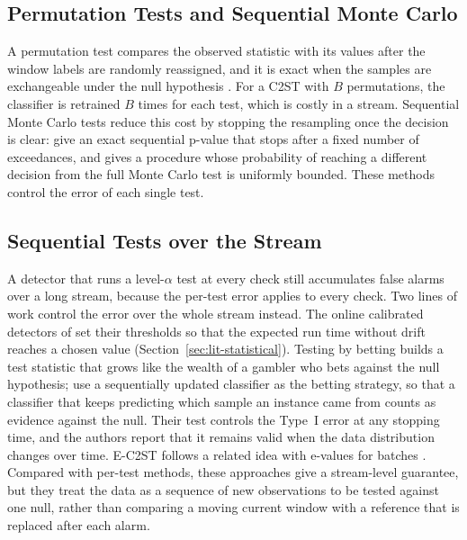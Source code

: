\subsection{Permutation Tests and Sequential Monte Carlo}
A permutation test compares the observed statistic with its values after the window labels are randomly reassigned, and it is exact when the samples are exchangeable under the null hypothesis \citep{Good2005}. For a C2ST with $B$ permutations, the classifier is retrained $B$ times for each test, which is costly in a stream. Sequential Monte Carlo tests reduce this cost by stopping the resampling once the decision is clear: \citet{BesagClifford1991} give an exact sequential p-value that stops after a fixed number of exceedances, and \citet{Gandy2009} gives a procedure whose probability of reaching a different decision from the full Monte Carlo test is uniformly bounded. These methods control the error of each single test.

\subsection{Sequential Tests over the Stream}
A detector that runs a level-$\alpha$ test at every check still accumulates false alarms over a long stream, because the per-test error applies to every check. Two lines of work control the error over the whole stream instead. The online calibrated detectors of \citet{CobbSequential2022} set their thresholds so that the expected run time without drift reaches a chosen value (Section~\ref{sec:lit-statistical}). Testing by betting builds a test statistic that grows like the wealth of a gambler who bets against the null hypothesis; \citet{PodkopaevRamdas2023} use a sequentially updated classifier as the betting strategy, so that a classifier that keeps predicting which sample an instance came from counts as evidence against the null. Their test controls the Type~I error at any stopping time, and the authors report that it remains valid when the data distribution changes over time. E-C2ST follows a related idea with e-values for batches \citep{EC2ST2024}. Compared with per-test methods, these approaches give a stream-level guarantee, but they treat the data as a sequence of new observations to be tested against one null, rather than comparing a moving current window with a reference that is replaced after each alarm.

